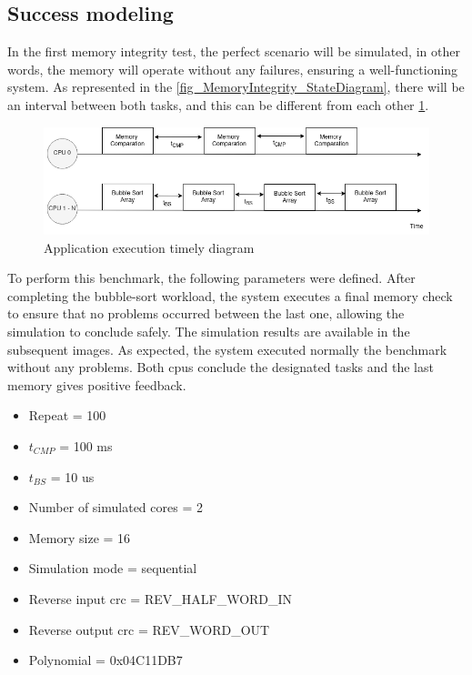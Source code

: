 \subsection{Success modeling}

In the first memory integrity test, the perfect scenario will be simulated, in other words, the memory will operate without any failures, 
ensuring a well-functioning system. As represented in the \autoref{fig_MemoryIntegrity_StateDiagram}, there will be an interval between both 
tasks, and this can be different from each other \ref{fig_AppTimeDiagram}. 

\begin{figure}[H]
	\centering
 	\includegraphics[width=0.8\linewidth]{Images/AppTimeDiagram.png}
 	\caption{Application execution timely diagram}
	 \label{fig_AppTimeDiagram}
\end{figure}


To perform this benchmark, the following parameters were defined. After completing the bubble-sort workload, the system executes a final 
memory check to ensure that no problems occurred between the last one, allowing the simulation to conclude safely. The simulation results are 
available in the subsequent images. As expected, the system executed normally the benchmark without any problems. Both \glspl{cpu} conclude the 
designated tasks and the last memory gives positive feedback. 

\hspace{1.5cm}

\begin{multicols}{2}
	
	\begin{itemize}
		\item Repeat = 100
		\item $t_{CMP}$ = 100 ms
		\item $t_{BS}$ = 10 us
		\item Number of simulated cores = 2
		\item Memory size = 16
	\end{itemize}

	\columnbreak

	\begin{itemize}
		\item Simulation mode = sequential
		\item Reverse input \gls*{crc} = REV\_HALF\_WORD\_IN
		\item Reverse output \gls*{crc} = REV\_WORD\_OUT
		\item Polynomial = 0x04C11DB7
	\end{itemize}

\end{multicols}


